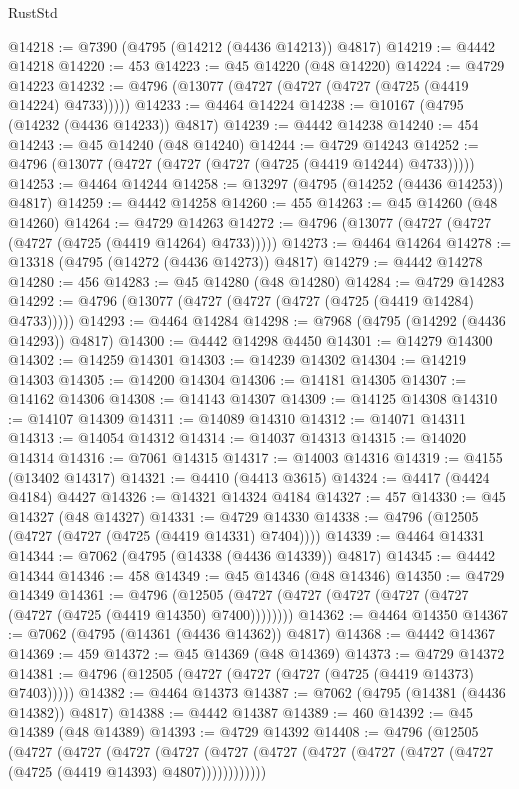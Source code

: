\begin{lexlean}{RustStd}
\begin{coremodule}
@14218 := @7390 (@4795 (@14212 (@4436 @14213)) @4817)
@14219 := @4442 @14218
@14220 := 453
@14223 := @45 @14220 (@48 @14220)
@14224 := @4729 @14223
@14232 := @4796 (@13077 (@4727 (@4727 (@4727 (@4725 (@4419 @14224) @4733)))))
@14233 := @4464 @14224
@14238 := @10167 (@4795 (@14232 (@4436 @14233)) @4817)
@14239 := @4442 @14238
@14240 := 454
@14243 := @45 @14240 (@48 @14240)
@14244 := @4729 @14243
@14252 := @4796 (@13077 (@4727 (@4727 (@4727 (@4725 (@4419 @14244) @4733)))))
@14253 := @4464 @14244
@14258 := @13297 (@4795 (@14252 (@4436 @14253)) @4817)
@14259 := @4442 @14258
@14260 := 455
@14263 := @45 @14260 (@48 @14260)
@14264 := @4729 @14263
@14272 := @4796 (@13077 (@4727 (@4727 (@4727 (@4725 (@4419 @14264) @4733)))))
@14273 := @4464 @14264
@14278 := @13318 (@4795 (@14272 (@4436 @14273)) @4817)
@14279 := @4442 @14278
@14280 := 456
@14283 := @45 @14280 (@48 @14280)
@14284 := @4729 @14283
@14292 := @4796 (@13077 (@4727 (@4727 (@4727 (@4725 (@4419 @14284) @4733)))))
@14293 := @4464 @14284
@14298 := @7968 (@4795 (@14292 (@4436 @14293)) @4817)
@14300 := @4442 @14298 @4450
@14301 := @14279 @14300
@14302 := @14259 @14301
@14303 := @14239 @14302
@14304 := @14219 @14303
@14305 := @14200 @14304
@14306 := @14181 @14305
@14307 := @14162 @14306
@14308 := @14143 @14307
@14309 := @14125 @14308
@14310 := @14107 @14309
@14311 := @14089 @14310
@14312 := @14071 @14311
@14313 := @14054 @14312
@14314 := @14037 @14313
@14315 := @14020 @14314
@14316 := @7061 @14315
@14317 := @14003 @14316
@14319 := @4155 (@13402 @14317)
@14321 := @4410 (@4413 @3615)
@14324 := @4417 (@4424 @4184) @4427
@14326 := @14321 @14324 @4184
@14327 := 457
@14330 := @45 @14327 (@48 @14327)
@14331 := @4729 @14330
@14338 := @4796 (@12505 (@4727 (@4727 (@4725 (@4419 @14331) @7404))))
@14339 := @4464 @14331
@14344 := @7062 (@4795 (@14338 (@4436 @14339)) @4817)
@14345 := @4442 @14344
@14346 := 458
@14349 := @45 @14346 (@48 @14346)
@14350 := @4729 @14349
@14361 := @4796
    (@12505 (@4727 (@4727 (@4727 (@4727 (@4727 (@4727 (@4725 (@4419 @14350) @7400))))))))
@14362 := @4464 @14350
@14367 := @7062 (@4795 (@14361 (@4436 @14362)) @4817)
@14368 := @4442 @14367
@14369 := 459
@14372 := @45 @14369 (@48 @14369)
@14373 := @4729 @14372
@14381 := @4796 (@12505 (@4727 (@4727 (@4727 (@4725 (@4419 @14373) @7403)))))
@14382 := @4464 @14373
@14387 := @7062 (@4795 (@14381 (@4436 @14382)) @4817)
@14388 := @4442 @14387
@14389 := 460
@14392 := @45 @14389 (@48 @14389)
@14393 := @4729 @14392
@14408 := @4796
    (@12505
      (@4727
        (@4727
          (@4727
            (@4727 (@4727 (@4727 (@4727 (@4727 (@4727 (@4727 (@4725 (@4419 @14393) @4807))))))))))))

\end{coremodule}
\end{lexlean}
